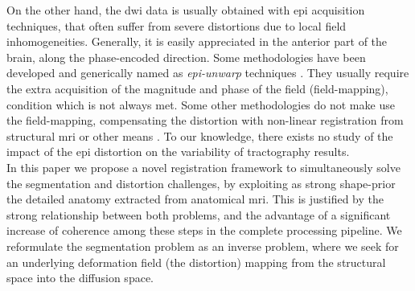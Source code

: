 On the other hand, the \ac{dwi} data is usually obtained with \ac{epi}
acquisition techniques, that often suffer from severe distortions due to 
local field inhomogeneities. Generally, it is easily appreciated in the anterior
part of the brain, along the phase-encoded direction. Some methodologies have
been developed and generically named as \emph{\ac{epi}-unwarp} techniques
\cite{holland_efficient_2010,hsu_correction_2009,jezzard_characterization_2005,
reber_correction_2005}. They usually 
require the extra acquisition of the magnitude and phase of
the field (field-mapping), condition which is not always met. Some other 
methodologies do not make use the field-mapping, compensating the distortion
with non-linear registration from structural \ac{mri} or other means
\citep{andersson_modeling_2001}. To our knowledge, there exists no study
of the impact of the \ac{epi} distortion on the variability of tractography
results. \\

In this paper we propose a novel registration framework to simultaneously
solve the segmentation and distortion challenges, by exploiting as strong 
shape-prior the detailed anatomy extracted from anatomical \ac{mri}. This
is justified by the strong relationship between both problems, and the
advantage of a significant increase of coherence among these steps in
the complete processing pipeline.
We reformulate the segmentation problem as an inverse problem, where
we seek for an underlying deformation field (the distortion) mapping 
from the structural space into the diffusion space.